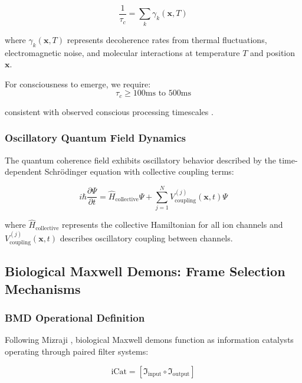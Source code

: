\documentclass[12pt,a4paper]{article}
\begin{document}
\begin{equation}
\frac{1}{\tau_c} = \sum_k \gamma_k(\mathbf{x},T)
\end{equation}

where $\gamma_k(\mathbf{x},T)$ represents decoherence rates from thermal fluctuations, electromagnetic noise, and molecular interactions at temperature $T$ and position $\mathbf{x}$.

For consciousness to emerge, we require:
\begin{equation}
\tau_c \geq 100\text{ms} \text{ to } 500\text{ms}
\end{equation}

consistent with observed conscious processing timescales \citep{libet1983time}.

\subsubsection{Oscillatory Quantum Field Dynamics}

The quantum coherence field exhibits oscillatory behavior described by the time-dependent Schrödinger equation with collective coupling terms:

\begin{equation}
i\hbar\frac{\partial\Psi}{\partial t} = \hat{H}_{\text{collective}}\Psi + \sum_{j=1}^{N} V_{\text{coupling}}^{(j)}(\mathbf{x},t)\Psi
\end{equation}

where $\hat{H}_{\text{collective}}$ represents the collective Hamiltonian for all ion channels and $V_{\text{coupling}}^{(j)}(\mathbf{x},t)$ describes oscillatory coupling between channels.

\subsection{Biological Maxwell Demons: Frame Selection Mechanisms}

\subsubsection{BMD Operational Definition}

Following Mizraji \citep{mizraji2021biological}, biological Maxwell demons function as information catalysts operating through paired filter systems:

\begin{equation}
\text{iCat} = [\Im_{\text{input}} \circ \Im_{\text{output}}]
\end{equation}
\end{document}
